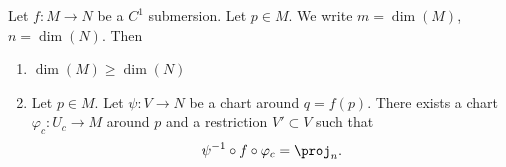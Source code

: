 \begin{theorem}	\label{THOooZQRLooUpkvAy}
	Let \(f \colon M\to N  \) be a \( C^1\) submersion. Let \( p\in M\). We write \( m=\dim(M)\), \( n=\dim(N)\). Then
	\begin{enumerate}
		\item
		      \( \dim(M)\geq \dim(N)\)
		\item
		      Let \( p\in M\). Let \(\psi \colon V\to N  \) be a chart around \( q=f(p)\). There exists a chart \(\varphi_c \colon U_c\to M  \) around \( p\) and a restriction \( V'\subset V\) such that
		      \begin{equation}
			      \psi^{-1}\circ f\circ\varphi_c=\proj_n.
		      \end{equation}
	\end{enumerate}
\end{theorem}

